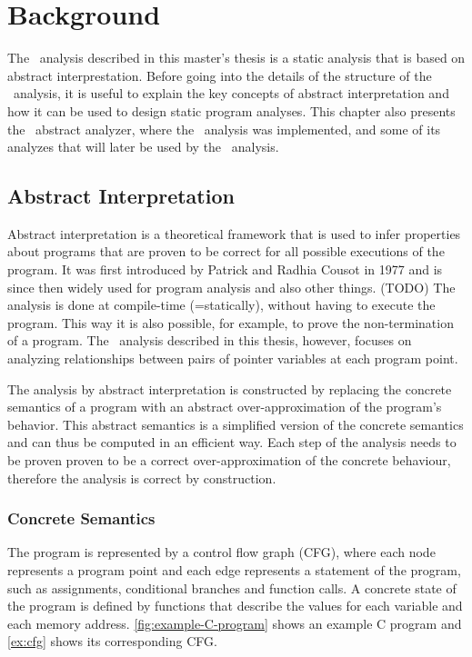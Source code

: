 \chapter{Background}

The \cpo\ analysis described in this master's thesis is a static analysis that is based on abstract interprestation.
Before going into the details of the structure of the \cpo\ analysis,
it is useful to explain the key concepts of abstract interpretation and how it can be used
to design static program analyses.
This chapter also presents the \goblint\ abstract analyzer, where the \cpo\ analysis was implemented, and some of its analyzes that will later be
used by the \cpo\ analysis.

\section{Abstract Interpretation}


Abstract interpretation is a theoretical framework that is used to infer properties about programs
that are proven to be correct for all possible executions of the program.
It was first introduced by Patrick and Radhia Cousot in 1977 \cite{TODO} and is since then widely used
for program analysis and also other things. (TODO)
The analysis is done at compile-time (=statically), without having to execute the program.
This way it is also possible, for example, to prove the non-termination of a program.
The \cpo\ analysis described in this thesis, however, focuses on analyzing
relationships between pairs of pointer variables at each program point.

The analysis by abstract interpretation is constructed by replacing the concrete
semantics of a program with an abstract over-approximation of the program's behavior.
This abstract semantics is a simplified version of the concrete semantics
and can thus be computed in an efficient way.
Each step of the analysis needs to be proven proven to be a correct over-approximation of the concrete behaviour,
therefore the analysis is correct by construction.

\subsection{Concrete Semantics}

The program is represented by a control flow graph (CFG), where each node represents a program point and each edge represents a statement of the program, such as assignments, conditional branches and function calls.
A concrete state of the program is defined by functions that describe the values for each variable and each memory address.
\cref{fig:example-C-program} shows an example C program and \cref{ex:cfg} shows its corresponding CFG.

